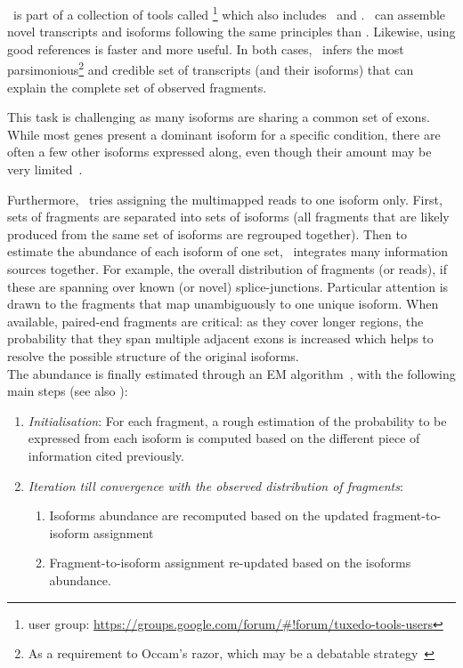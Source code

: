 \label{minisec:Cufflinks}
\cuffl\ is part of a collection of tools called
\footnote{ user group:
\href{https://groups.google.com/forum/\#!forum/tuxedo-tools-users}%
{https://groups.google.com/forum/\#!forum/tuxedo-tools-users}} which also includes
\toph\ and .
\cuffl\ can assemble
 novel transcripts and isoforms following the same principles
than \toph. Likewise, using good references is faster and more useful.
In both cases, \cuffl\ infers the most parsimonious\footnote{As a requirement to
Occam's razor, which may be a debatable strategy~}
and credible set of transcripts (and their isoforms) that can explain the
complete set of observed fragments.\mybr\

This task is challenging as many isoforms are sharing a common set of exons.
While most genes present a dominant isoform for a specific condition,
there are often a few other isoforms expressed along, even though their amount
may be very limited~.\mybr\

Furthermore, \cuffl\ tries assigning the multimapped reads to one isoform only.
First, sets of fragments are separated into sets of isoforms
(all fragments that are likely produced from the same set of isoforms
are regrouped together).
Then to estimate the abundance of each isoform of one set,
\cuffl\ integrates many information sources together.
For example, the overall distribution of fragments
(or reads), if these are spanning over known (or novel) splice-junctions.
Particular attention is drawn to the fragments that map unambiguously to one
unique isoform. When available, paired-end fragments are critical:
as they cover longer regions, the probability
that they span multiple adjacent exons is increased which helps to resolve
the possible structure of the original isoforms. \\
The abundance is finally estimated through
an \gls{EM} algorithm~,
with the following main steps (see also ):\mybr\
\begin{enumerate}
    \item \emph{Initialisation}: For each fragment, a rough estimation of the
        probability to be expressed from each isoform is computed based on the
        different piece of information cited previously.
\item \emph{Iteration till convergence with the observed distribution of fragments}:
    \begin{enumerate}
        \item Isoforms abundance are recomputed based on the updated
            fragment-to-isoform assignment
        \item Fragment-to-isoform assignment re-updated based on the isoforms
            abundance.
    \end{enumerate}
\end{enumerate}


